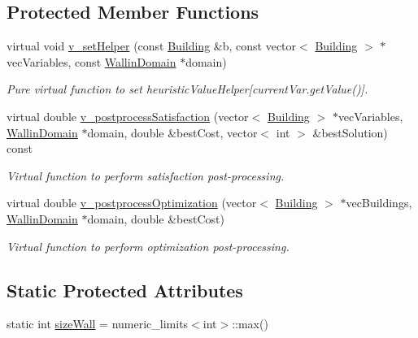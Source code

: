 \subsection*{Protected Member Functions}
\begin{DoxyCompactItemize}
\item 
virtual void \hyperlink{classghost_1_1WallinObjective_abc0f66adeebca9f9787a4ae348219fb8}{v\-\_\-set\-Helper} (const \hyperlink{classghost_1_1Building}{Building} \&b, const vector$<$ \hyperlink{classghost_1_1Building}{Building} $>$ $\ast$vec\-Variables, const \hyperlink{classghost_1_1WallinDomain}{Wallin\-Domain} $\ast$domain)
\begin{DoxyCompactList}\small\item\em Pure virtual function to set heuristic\-Value\-Helper\mbox{[}current\-Var.\-get\-Value()\mbox{]}. \end{DoxyCompactList}\item 
virtual double \hyperlink{classghost_1_1WallinObjective_acc06e32003541f6ed5c147d1353c852f}{v\-\_\-postprocess\-Satisfaction} (vector$<$ \hyperlink{classghost_1_1Building}{Building} $>$ $\ast$vec\-Variables, \hyperlink{classghost_1_1WallinDomain}{Wallin\-Domain} $\ast$domain, double \&best\-Cost, vector$<$ int $>$ \&best\-Solution) const 
\begin{DoxyCompactList}\small\item\em Virtual function to perform satisfaction post-\/processing. \end{DoxyCompactList}\item 
virtual double \hyperlink{classghost_1_1WallinObjective_aa30f157bc7a09fdfe2a671960e4e60df}{v\-\_\-postprocess\-Optimization} (vector$<$ \hyperlink{classghost_1_1Building}{Building} $>$ $\ast$vec\-Buildings, \hyperlink{classghost_1_1WallinDomain}{Wallin\-Domain} $\ast$domain, double \&best\-Cost)
\begin{DoxyCompactList}\small\item\em Virtual function to perform optimization post-\/processing. \end{DoxyCompactList}\end{DoxyCompactItemize}
\subsection*{Static Protected Attributes}
\begin{DoxyCompactItemize}
\item 
static int \hyperlink{classghost_1_1WallinObjective_aef1d7697ca6b29eccb4f3c62f42316ed}{size\-Wall} = numeric\-\_\-limits$<$int$>$\-::max()
\end{DoxyCompactItemize}
